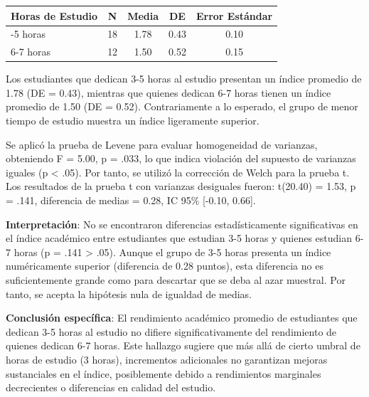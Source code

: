 \documentclass[
  stu,
  floatsintext,
  longtable,
  a4paper,
  nolmodern,
  notxfonts,
  notimes,
  12pt,
  colorlinks=true,linkcolor=blue,citecolor=blue,urlcolor=blue]{apa7}
\newcounter{none} %
\begin{document}
\begin{table}

{\caption{{Estadísticas Descriptivas del Índice Académico según Horas de
Estudio}{\label{tbl-horas-estudio}}}}

{\def\LTcaptype{none} %
\begin{longtable}[]{@{}lcccc@{}}
\toprule\noalign{}
Horas de Estudio & N & Media & DE & Error Estándar \\
\midrule\noalign{}
\endhead
\bottomrule\noalign{}
\endlastfoot
3-5 horas & 18 & 1.78 & 0.43 & 0.10 \\
6-7 horas & 12 & 1.50 & 0.52 & 0.15 \\
\end{longtable}
}

\end{table}

Los estudiantes que dedican 3-5 horas al estudio presentan un índice
promedio de 1.78 (DE = 0.43), mientras que quienes dedican 6-7 horas
tienen un índice promedio de 1.50 (DE = 0.52). Contrariamente a lo
esperado, el grupo de menor tiempo de estudio muestra un índice
ligeramente superior.

Se aplicó la prueba de Levene para evaluar homogeneidad de varianzas,
obteniendo F = 5.00, p = .033, lo que indica violación del supuesto de
varianzas iguales (p \textless{} .05). Por tanto, se utilizó la
corrección de Welch para la prueba t. Los resultados de la prueba t con
varianzas desiguales fueron: t(20.40) = 1.53, p = .141, diferencia de
medias = 0.28, IC 95\% {[}-0.10, 0.66{]}.

\textbf{Interpretación}: No se encontraron diferencias estadísticamente
significativas en el índice académico entre estudiantes que estudian 3-5
horas y quienes estudian 6-7 horas (p = .141 \textgreater{} .05). Aunque
el grupo de 3-5 horas presenta un índice numéricamente superior
(diferencia de 0.28 puntos), esta diferencia no es suficientemente
grande como para descartar que se deba al azar muestral. Por tanto, se
acepta la hipótesis nula de igualdad de medias.

\textbf{Conclusión específica}: El rendimiento académico promedio de
estudiantes que dedican 3-5 horas al estudio no difiere
significativamente del rendimiento de quienes dedican 6-7 horas. Este
hallazgo sugiere que más allá de cierto umbral de horas de estudio (3
horas), incrementos adicionales no garantizan mejoras sustanciales en el
índice, posiblemente debido a rendimientos marginales decrecientes o
diferencias en calidad del estudio.
\end{document}
